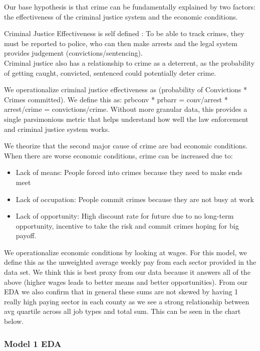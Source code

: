 \documentclass[]{article}
\providecommand{\tightlist}{%
  \setlength{\itemsep}{0pt}\setlength{\parskip}{0pt}}
\begin{document}
Our base hypothesis is that crime can be fundamentally explained by two
factors: the effectiveness of the criminal justice system and the
economic conditions.

Criminal Justice Effectiveness is self defined : To be able to track
crimes, they must be reported to police, who can then make arrests and
the legal system provides judgement (convictions/sentencing).\\
Criminal justice also has a relationship to crime as a deterrent, as the
probability of getting caught, convicted, sentenced could potentially
deter crime.

We operationalize criminal justice effectiveness as (probability of
Convictions * Crimes committed). We define this as: prbconv * prbarr =
conv/arrest * arrest/crime = convictions/crime. Without more granular
data, this provides a single parsimonious metric that helps understand
how well the law enforcement and criminal justice system works.

We theorize that the second major cause of crime are bad economic
conditions. When there are worse economic conditions, crime can be
increased due to:

\begin{itemize}
\tightlist
\item
  Lack of means: People forced into crimes because they need to make
  ends meet
\item
  Lack of occupation: People commit crimes because they are not busy at
  work
\item
  Lack of opportunity: High discount rate for future due to no long-term
  opportunity, incentive to take the risk and commit crimes hoping for
  big payoff.
\end{itemize}

We operationalize economic conditions by looking at wages. For this
model, we define this as the unweighted average weekly pay from each
sector provided in the data set. We think this is best proxy from our
data because it answers all of the above (higher wages leads to better
means and better opportunities). From our EDA we also confirm that in
general these sums are not skewed by having 1 really high paying sector
in each county as we see a strong relationship between avg quartile
across all job types and total sum. This can be seen in the chart below.

\hypertarget{model-1-eda}{%
\subsubsection{Model 1 EDA}\label{model-1-eda}}
\end{document}
